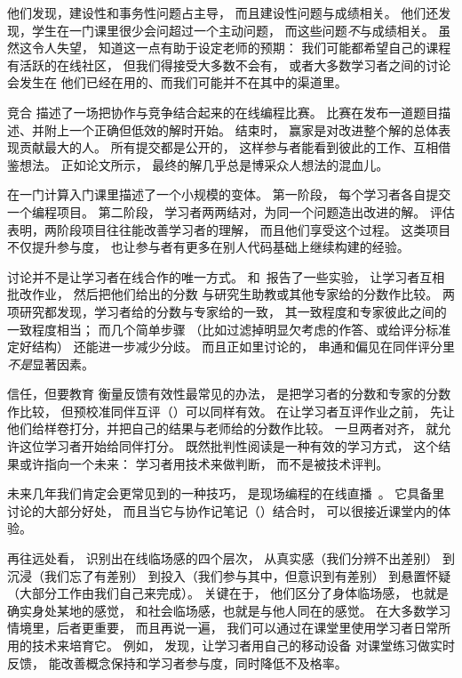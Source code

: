他们发现，建设性和事务性问题占主导，
而且建设性问题与成绩相关。
他们还发现，学生在一门课里很少会问超过一个主动问题，
而这些问题\emph{不}与成绩相关。
虽然这令人失望，
知道这一点有助于设定老师的预期：
我们可能都希望自己的课程有活跃的在线社区，
但我们得接受大多数不会有，
或者大多数学习者之间的讨论会发生在
他们已经在用的、而我们可能并不在其中的渠道里。

\begin{aside}{竞合}
  \cite{Gull2004}描述了一场把协作与竞争结合起来的在线编程比赛。
  比赛在发布一道题目描述、并附上一个正确但低效的解时开始。
  结束时，
  赢家是对改进整个解的总体表现贡献最大的人。
  所有提交都是公开的，
  这样参与者能看到彼此的工作、互相借鉴想法。
  正如论文所示，
  最终的解几乎总是博采众人想法的混血儿。

  \cite{Batt2018}在一门计算入门课里描述了一个小规模的变体。
  第一阶段，
  每个学习者各自提交一个编程项目。
  第二阶段，
  学习者两两结对，为同一个问题造出改进的解。
  评估表明，两阶段项目往往能改善学习者的理解，
  而且他们享受这个过程。
  这类项目不仅提升参与度，
  也让参与者有更多在别人代码基础上继续构建的经验。
\end{aside}

讨论并不是让学习者在线合作的唯一方式。
\cite{Pare2008}和~\cite{Kulk2013}报告了一些实验，
让学习者互相批改作业，
然后把他们给出的分数
与研究生助教或其他专家给的分数作比较。
两项研究都发现，学习者给的分数与专家给的一致，
其一致程度和专家彼此之间的一致程度相当；
而几个简单步骤
（比如过滤掉明显欠考虑的作答、或给评分标准定好结构）
还能进一步减少分歧。
而且正如里讨论的，
串通和偏见在同伴评分里\emph{不是}显著因素。

\begin{aside}{信任，但要教育}
  衡量反馈有效性最常见的办法，
  是把学习者的分数和专家的分数作比较，
  但预校准同伴互评（）可以同样有效。
  在让学习者互评作业之前，
  先让他们给样卷打分，并把自己的结果与老师给的分数作比较。
  一旦两者对齐，
  就允许这位学习者开始给同伴打分。
  既然批判性阅读是一种有效的学习方式，
  这个结果或许指向一个未来：
  学习者用技术来做判断，
  而不是被技术评判。
\end{aside}

未来几年我们肯定会更常见到的一种技巧，
是现场编程的在线直播~\cite{Raj2018,Haar2017}。
它具备里讨论的大部分好处，
而且当它与协作记笔记（）结合时，
可以很接近课堂内的体验。

再往远处看，
\cite{Ijss2000}识别出在线临场感的四个层次，
从真实感（我们分辨不出差别）
到沉浸（我们忘了有差别）
到投入（我们参与其中，但意识到有差别）
到悬置怀疑（大部分工作由我们自己来完成）。
关键在于，
他们区分了身体临场感，
也就是确实身处某地的感觉，
和社会临场感，也就是与他人同在的感觉。
在大多数学习情境里，后者更重要，
而且再说一遍，
我们可以通过在课堂里使用学习者日常所用的技术来培育它。
例如，
\cite{Deb2018}发现，让学习者用自己的移动设备
对课堂练习做实时反馈，
能改善概念保持和学习者参与度，同时降低不及格率。


